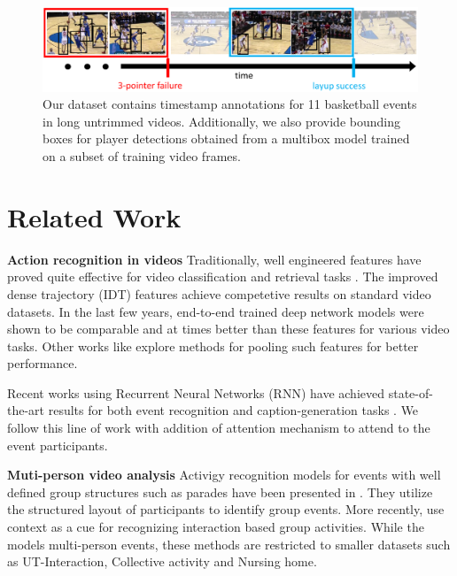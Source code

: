 
\begin{figure}[ht!]
  \includegraphics[width=6.5 in]{images/dataset_figure_cropped.pdf}
  \caption{Our dataset contains timestamp annotations for 11 basketball events
    in long untrimmed videos. Additionally, we also provide bounding boxes for player
    detections obtained from a multibox model trained on a subset of training
  video frames.}
\end{figure}



\section{Related Work}


\noindent \textbf{Action recognition in videos}
Traditionally, well engineered features have proved quite effective for video
classification and retrieval tasks
\cite{Dalal_ECCV06,Jain_CVPR13,Jiang_ECCV12,Laptev_CVPR08,
Niebels_ECCV10,Oh_MVA14,Oneata_ICCV13,Peng_ECCV14,Sadanand_CVPR12,Wang_BMVC09,Wang_CVPR11}.
The improved dense trajectory (IDT) features \cite{Wang_CVPR11} achieve
competetive results on standard video datasets.  In the last few years,
end-to-end trained deep network models
\cite{Ji_PAMI13,Karpathy_CVPR14,Simonyan_2014,Tran_arxiv14} were shown to be comparable and
at times better than these features for various video tasks.  Other works like
\cite{Xu_2015,Zha_2015,Wang_arxiv15} explore methods for pooling such
features for better performance.

Recent works using Recurrent Neural Networks (RNN) have achieved
state-of-the-art results for both event recognition and caption-generation
tasks \cite{Donahue_arxiv14,Ng_arxiv15,Srivastava_2015,Yao_arxiv15}.
We follow this line of work with addition of attention mechanism
to attend to the event participants.

\noindent \textbf{Muti-person video analysis}
Activigy recognition models for events with well defined group structures such
as parades have been presented in
\cite{Vaswani_CVPR03,Intille_CVIU01,Moore_AAAI02,Khan_ACM05}.  They utilize the
structured layout of participants to identify group events. More
recently, \cite{Lan_PAMI12,Choi_ICCV09,Khodabandeh_arxiv15} use context as a
cue for recognizing interaction based group activities.  While the models
multi-person events, these methods are restricted to smaller
datasets such as UT-Interaction\cite{Ryoo_10}, Collective activity
\cite{Choi_ICCV09} and Nursing home\cite{Lan_PAMI12}.

